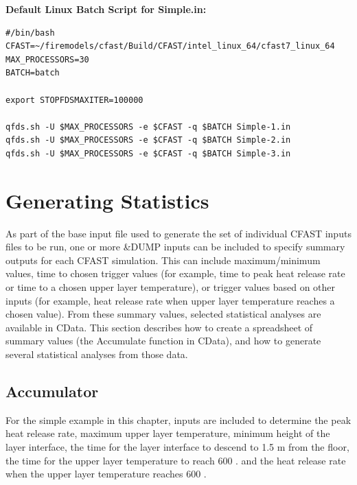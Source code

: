 \documentclass[12pt,twoside]{book}
\begin{document}
\vspace{\baselineskip}
\noindent \textbf{Default Linux Batch Script for Simple.in:}

\begin{lstlisting}[basicstyle=\scriptsize]
#/bin/bash
CFAST=~/firemodels/cfast/Build/CFAST/intel_linux_64/cfast7_linux_64
MAX_PROCESSORS=30
BATCH=batch

export STOPFDSMAXITER=100000

qfds.sh -U $MAX_PROCESSORS -e $CFAST -q $BATCH Simple-1.in
qfds.sh -U $MAX_PROCESSORS -e $CFAST -q $BATCH Simple-2.in
qfds.sh -U $MAX_PROCESSORS -e $CFAST -q $BATCH Simple-3.in
\end{lstlisting}

\section{Generating Statistics}

As part of the base input file used to generate the set of individual CFAST inputs files to be run, one or more {\ct \&DUMP} inputs can be included to specify summary outputs for each CFAST simulation. This can include maximum/minimum values, time to chosen trigger values (for example, time to peak heat release rate or time to a chosen upper layer temperature), or trigger values based on other inputs (for example, heat release rate when upper layer temperature reaches a chosen value). From these summary values, selected statistical analyses are available in CData. This section describes how to create a spreadsheet of summary values (the Accumulate function in CData), and how to generate several statistical analyses from those data.

\subsection{Accumulator}

For the simple example in this chapter, inputs are included to determine the peak heat release rate, maximum upper layer temperature, minimum height of the layer interface, the time for the layer interface to descend to 1.5 m from the floor, the time for the upper layer temperature to reach 600 \degc. and the heat release rate when the upper layer temperature reaches 600 \degc.
\end{document}
